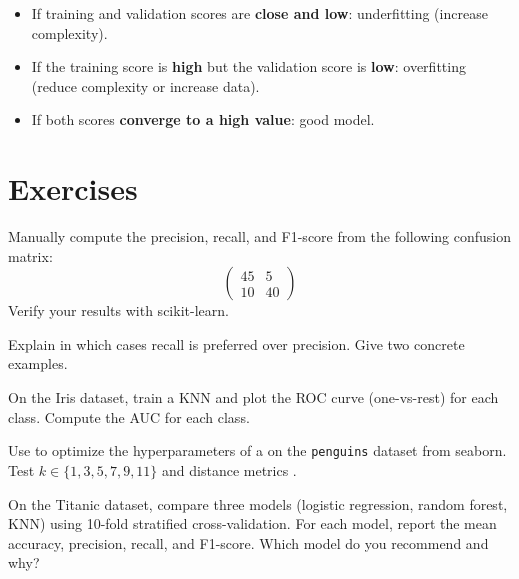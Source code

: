 \begin{intuition}
\begin{itemize}
    \item If training and validation scores are \textbf{close and low}: underfitting (increase complexity).
    \item If the training score is \textbf{high} but the validation score is \textbf{low}: overfitting (reduce complexity or increase data).
    \item If both scores \textbf{converge to a high value}: good model.
\end{itemize}
\end{intuition}

\section{Exercises}

\begin{exercise}[$\star$]
Manually compute the precision, recall, and F1-score from the following confusion matrix:
\[
\begin{pmatrix} 45 & 5 \\ 10 & 40 \end{pmatrix}
\]
Verify your results with scikit-learn.
\end{exercise}

\begin{exercise}[$\star$]
Explain in which cases recall is preferred over precision. Give two concrete examples.
\end{exercise}

\begin{exercise}[$\star\star$]
On the Iris dataset, train a KNN and plot the ROC curve (one-vs-rest) for each class. Compute the AUC for each class.
\end{exercise}

\begin{exercise}[$\star\star$]
Use  to optimize the hyperparameters of a  on the \texttt{penguins} dataset from seaborn. Test $k \in \{1, 3, 5, 7, 9, 11\}$ and distance metrics .
\end{exercise}

\begin{exercise}[$\star\star\star$]
On the Titanic dataset, compare three models (logistic regression, random forest, KNN) using 10-fold stratified cross-validation. For each model, report the mean accuracy, precision, recall, and F1-score. Which model do you recommend and why?
\end{exercise}

